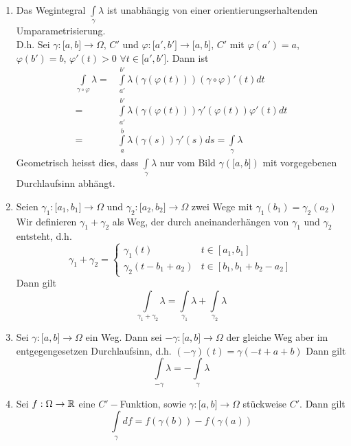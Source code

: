 \begin{enumerate}[\indent E1)]
\item Das Wegintegral $\int\limits_\gamma  \lambda  $ ist unabhängig von einer orientierungserhaltenden Umparametrisierung. \\
D.h. Sei $\gamma :\lbrack a,b\rbrack\to\Omega$, $C'$ und $\varphi :\lbrack a',b'\rbrack\to\lbrack a,b\rbrack$, $C'$ mit $\varphi\left( a'\right)=a$, $\varphi\left( b'\right)=b$, $\varphi'\left( t\right) >0$ $\forall t\in\lbrack a', b'\rbrack$. Dann ist
\begin{align*}
\int\limits_{\gamma  \circ \varphi } \lambda   = &\int\limits_{a'}^{b'} {\lambda \left( {\gamma \left( {\varphi (t)} \right)} \right)\left( {\gamma  \circ \varphi } \right)'(t)dt} \\
 = &\int\limits_{a'}^{b'} {\lambda \left( {\gamma \left( {\varphi (t)} \right)} \right)\gamma '\left( {\varphi (t)} \right)\varphi '(t)dt} \\
 = &\int\limits_a^b {\lambda \left( {\gamma \left( s \right)} \right)\gamma '\left( s \right)ds = \int\limits_\gamma  \lambda  }
\end{align*}
Geometrisch heisst dies, dass $\int\limits_\gamma  \lambda$ nur vom Bild $\gamma\left( \lbrack a,b\rbrack\right)$ mit vorgegebenen Durchlaufsinn abhängt.
\item Seien $\gamma_1:\lbrack a_1,b_1\rbrack\to\Omega$ und $\gamma_2:\lbrack a_2,b_2\rbrack\to\Omega$ zwei Wege mit $\gamma_1\left( b_1\right)=\gamma_2\left(a_2\right)$
Wir definieren $\gamma_1+\gamma_2$ als Weg, der durch aneinanderhängen von $\gamma_1$ und $\gamma_2$ entsteht, d.h.
\[{\gamma _1} + {\gamma _2} = \left\{ {\begin{array}{*{20}{c}}
{{\gamma _1}(t)}&{t \in \left[ {{a_1},{b_1}} \right]}\\
{{\gamma _2}\left( {t - {b_1} + {a_2}} \right)}&{t \in \left[ {{b_1},{b_1} + {b_2} - {a_2}} \right]}
\end{array}} \right.\]
Dann gilt \[\int\limits_{{\gamma _1} + {\gamma _2}} \lambda   = \int\limits_{{\gamma _1}} \lambda   + \int\limits_{{\gamma _2}} \lambda  \]
\item Sei $\gamma:\lbrack a,b\rbrack\to\Omega$ ein Weg. Dann sei $-\gamma:\lbrack a,b\rbrack\to\Omega$ der gleiche Weg aber im entgegengesetzen Durchlaufsinn, d.h. $\left( -\gamma\right) (t)=\gamma\left( -t+a+b\right)$
Dann gilt \[\int\limits_{ - \gamma } \lambda   =  - \int\limits_\gamma  \lambda  \]
\item Sei $f:\Omega\to\mathbb{R}$ eine $C'-$Funktion, sowie $\gamma:\lbrack a,b\rbrack\to\Omega$ stückweise $C'$. Dann gilt \[\int\limits_\gamma  {df}  = f\left( {\gamma \left( b \right)} \right) - f\left( {\gamma \left( a \right)} \right)\]

\end{enumerate}
